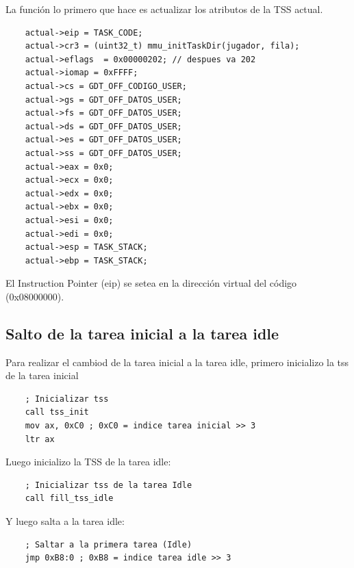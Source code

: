 \documentclass[a4paper]{article}
\newenvironment{codesnippet}{%
	\begin{Sbox}\begin{minipage}{\textwidth}\sffamily\small}%
	{\end{minipage}\end{Sbox}%
		\begin{center}%
		\vspace{-0.4cm}\colorbox{litegrey}{\TheSbox}\end{center}\vspace{0.3cm}}
\begin{document}
La función lo primero que hace es actualizar los atributos de la TSS actual.

\begin{codesnippet}
  \begin{verbatim}
    actual->eip = TASK_CODE;
    actual->cr3 = (uint32_t) mmu_initTaskDir(jugador, fila);
    actual->eflags  = 0x00000202; // despues va 202
    actual->iomap = 0xFFFF;
    actual->cs = GDT_OFF_CODIGO_USER;
    actual->gs = GDT_OFF_DATOS_USER;
    actual->fs = GDT_OFF_DATOS_USER;
    actual->ds = GDT_OFF_DATOS_USER;
    actual->es = GDT_OFF_DATOS_USER;
    actual->ss = GDT_OFF_DATOS_USER;
    actual->eax = 0x0;
    actual->ecx = 0x0;
    actual->edx = 0x0;
    actual->ebx = 0x0;
    actual->esi = 0x0;
    actual->edi = 0x0;
    actual->esp = TASK_STACK;
    actual->ebp = TASK_STACK;
  \end{verbatim}
\end{codesnippet}

El Instruction Pointer (eip) se setea en la dirección virtual del código (0x08000000).


\subsection{Salto de la tarea inicial a la tarea idle}

Para realizar el cambiod de la tarea inicial a la tarea idle, primero inicializo la tss de la tarea inicial

\begin{codesnippet}
  \begin{verbatim}
    ; Inicializar tss
    call tss_init
    mov ax, 0xC0 ; 0xC0 = indice tarea inicial >> 3
    ltr ax
  \end{verbatim}
\end{codesnippet}

Luego inicializo la TSS de la tarea idle:

\begin{codesnippet}
  \begin{verbatim}
    ; Inicializar tss de la tarea Idle
    call fill_tss_idle
  \end{verbatim}
\end{codesnippet}

Y luego salta a la tarea idle:

\begin{codesnippet}
  \begin{verbatim}
    ; Saltar a la primera tarea (Idle)
    jmp 0xB8:0 ; 0xB8 = indice tarea idle >> 3
  \end{verbatim}
\end{codesnippet}
\end{document}

